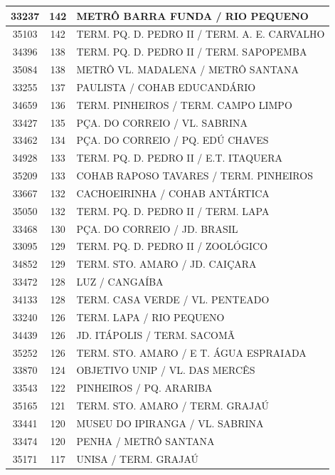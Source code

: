 \documentclass[
	12pt,				%
	oneside,			%
	a4paper,			%
	english,			%
	brazil				%
	]{abntex2ppgsi}
\begin{document}
\begin{apendicesenv}
\begin{longtable}{c|c|p{7cm}}
    33237 & 142   & METRÔ BARRA FUNDA / RIO PEQUENO \\
\hline
    35103 & 142   & TERM. PQ. D. PEDRO II / TERM. A. E. CARVALHO \\
\hline
    34396 & 138   & TERM. PQ. D. PEDRO II / TERM. SAPOPEMBA \\
\hline
    35084 & 138   & METRÔ VL. MADALENA / METRÔ SANTANA \\
\hline
    33255 & 137   & PAULISTA / COHAB EDUCANDÁRIO \\
\hline
    34659 & 136   & TERM. PINHEIROS / TERM. CAMPO LIMPO \\
\hline
    33427 & 135   & PÇA. DO CORREIO / VL. SABRINA \\
\hline
    33462 & 134   & PÇA. DO CORREIO / PQ. EDÚ CHAVES \\
\hline
    34928 & 133   & TERM. PQ. D. PEDRO II / E.T. ITAQUERA \\
\hline
    35209 & 133   & COHAB RAPOSO TAVARES / TERM. PINHEIROS \\
\hline
    33667 & 132   & CACHOEIRINHA / COHAB ANTÁRTICA \\
\hline
    35050 & 132   & TERM. PQ. D. PEDRO II / TERM. LAPA \\
\hline
    33468 & 130   & PÇA. DO CORREIO / JD. BRASIL \\
\hline
    33095 & 129   & TERM. PQ. D. PEDRO II / ZOOLÓGICO \\
\hline
    34852 & 129   & TERM. STO. AMARO / JD. CAIÇARA \\
\hline
    33472 & 128   & LUZ / CANGAÍBA \\
\hline
    34133 & 128   & TERM. CASA VERDE / VL. PENTEADO \\
\hline
    33240 & 126   & TERM. LAPA / RIO PEQUENO \\
\hline
    34439 & 126   & JD. ITÁPOLIS / TERM. SACOMÃ \\
\hline
    35252 & 126   & TERM. STO. AMARO / E T. ÁGUA ESPRAIADA \\
\hline
    33870 & 124   & OBJETIVO UNIP / VL. DAS MERCÊS \\
\hline
    33543 & 122   & PINHEIROS / PQ. ARARIBA \\
\hline
    35165 & 121   & TERM. STO. AMARO / TERM. GRAJAÚ \\
\hline
    33441 & 120   & MUSEU DO IPIRANGA / VL. SABRINA \\
\hline
    33474 & 120   & PENHA / METRÔ SANTANA \\
\hline
    35171 & 117   & UNISA / TERM. GRAJAÚ \\

\end{longtable}
\end{apendicesenv}
\end{document}
